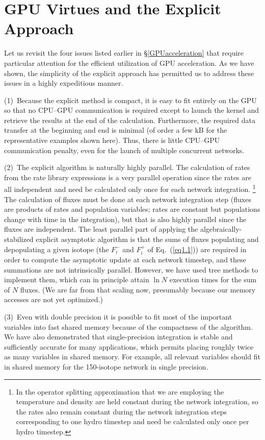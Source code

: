 \documentclass[]{elsart}
\newcommand{\fplus}[1]{F^+_{#1}}
\newcommand{\fminus}[1]{F^-_{#1}}
\newcommand{\eq}[1]{Eq.~(\ref{#1})}
\begin{document}
\section{GPU Virtues and the Explicit Approach}

Let us revisit the four issues listed earlier in \S\ref{GPUacceleration} that 
require particular attention for the efficient utilization of GPU acceleration. 
As we have shown, the simplicity of the explicit approach has permitted us to 
address these issues in a highly expeditious manner.

(1)~Because the explicit method is compact, 
it is easy to fit entirely on the GPU so that no CPU--GPU communication is 
required except to launch the kernel and retrieve the results at the end of the 
calculation.  Furthermore, the required data transfer at the beginning and 
end is minimal (of order a few kB for the representative examples shown here).  
Thus, there is little CPU--GPU communication penalty, even for the launch of 
multiple concurrent networks.

(2)~The explicit algorithm is naturally highly parallel.  The calculation of 
rates from the rate library expressions is a very parallel operation 
since the rates are all independent and need be calculated only once for each 
network integration.%
%
%
\footnote{
In the operator splitting approximation that we are employing the temperature 
and density are held constant during the network integration, so the rates also 
remain constant during the network integration steps corresponding to one hydro 
timestep and need be calculated only once per hydro timestep.
}
%
%
The calculation of fluxes must be done at each network integration step (fluxes 
are products of rates and population variables; rates are constant but 
populations change with time in the integration), but that is also highly 
parallel since the fluxes are independent.  The least parallel part of applying 
the algebraically-stabilized explicit asymptotic algorithm is that the sums of 
fluxes populating and depopulating a given isotope (the $\fminus i$ and $\fplus 
i$ of \eq{eq1.1}) are required in order to compute the asymptotic update at each 
network timestep, and these summations are not intrinsically parallel.  However, 
we have used tree methods to implement them, which can in principle attain $\ln 
N$ execution times for the sum of $N$ fluxes. (We are far from that scaling now, 
presumably because our memory accesses are not yet optimized.)


(3)~Even with double precision it is possible to fit most of the important 
variables into fast shared memory because of the compactness of the algorithm. 
We have also demonstrated that single-precision integration is stable and 
sufficiently accurate for many applications,  which permits placing roughly 
twice as many variables in shared memory.  For example,  all relevant variables 
should fit in shared memory for the 150-isotope network in single precision. 
\end{document}
